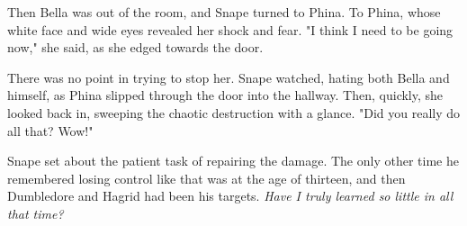 Then Bella was out of the room, and Snape turned to Phina. To Phina, whose white face and wide eyes revealed her shock and fear. "I{\el} think{\el} I need to be going now," she said, as she edged towards the door.

There was no point in trying to stop her. Snape watched, hating both Bella and himself, as Phina slipped through the door into the hallway. Then, quickly, she looked back in, sweeping the chaotic destruction with a glance. "Did you really do all that? Wow!"

Snape set about the patient task of repairing the damage. The only other time he remembered losing control like that was at the age of thirteen, and then Dumbledore and Hagrid had been his targets. \emph{Have I truly learned so little in all that time?}



